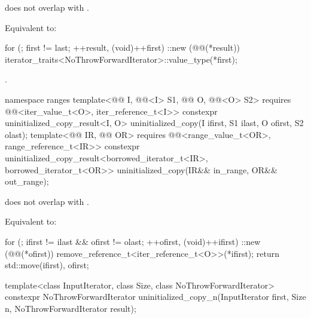 \begin{itemdescr}
\pnum
\expects
{} does not overlap with .

\pnum
\effects
Equivalent to:
\begin{codeblock}
for (; first != last; ++result, (void)++first)
  ::new (@@(*result)) iterator_traits<NoThrowForwardIterator>::value_type(*first);
\end{codeblock}

\pnum
\returns
{}.
\end{itemdescr}

%
\begin{itemdecl}
namespace ranges {
  template<@@ I, @@<I> S1,
           @@ O, @@<O> S2>
    requires @@<iter_value_t<O>, iter_reference_t<I>>
    constexpr uninitialized_copy_result<I, O>
      uninitialized_copy(I ifirst, S1 ilast, O ofirst, S2 olast);
  template<@@ IR, @@ OR>
    requires @@<range_value_t<OR>, range_reference_t<IR>>
    constexpr uninitialized_copy_result<borrowed_iterator_t<IR>, borrowed_iterator_t<OR>>
      uninitialized_copy(IR&& in_range, OR&& out_range);
}
\end{itemdecl}

\begin{itemdescr}
\pnum
\expects
{} does not overlap with .

\pnum
\effects
Equivalent to:
\begin{codeblock}
for (; ifirst != ilast && ofirst != olast; ++ofirst, (void)++ifirst)
  ::new (@@(*ofirst)) remove_reference_t<iter_reference_t<O>>(*ifirst);
return {std::move(ifirst), ofirst};
\end{codeblock}
\end{itemdescr}

%
\begin{itemdecl}
template<class InputIterator, class Size, class NoThrowForwardIterator>
  constexpr NoThrowForwardIterator uninitialized_copy_n(InputIterator first, Size n,
                                                        NoThrowForwardIterator result);
\end{itemdecl}

